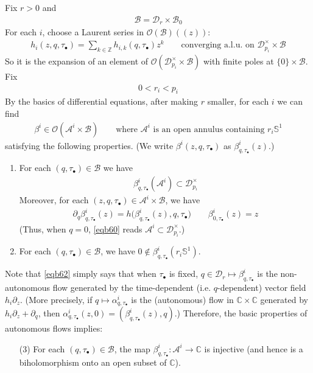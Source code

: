 \documentclass[11pt,b5paper,notitlepage]{article}
\theoremstyle{definition}
\theoremstyle{plain}
\newcommand{\mc}{\mathcal}
\newcommand{\Sbb}{\mathbb{S}}
\newcommand{\blt}{\bullet}
\newcommand{\Cbb}{\mathbb C}
\newcommand{\Zbb}{\mathbb Z}
\newcommand{\<}{\left\langle}
\renewcommand{\>}{\right\rangle}
\newcommand{\MB}{\mathcal{B}}
\numberwithin{equation}{subsection}
\begin{document}
Fix $r>0$ and
\begin{align*}
\MB=\mc D_r\times \MB_0
\end{align*}
For each $i$, choose a Laurent series in $\mc O(\MB)((z))$: 
\begin{align*}
h_i(z,q,\tau_\blt)=\sum_{k\in\Zbb}h_{i,k}(q,\tau_\blt)z^k\qquad\text{converging a.l.u. on }\mc D_{p_i}^\times\times\MB
\end{align*}
So it is the expansion of an element of $\mc O(\mc D_{p_i}^\times\times\MB)$ with finite poles at $\{0\}\times\MB$. Fix
\begin{align*}
0<r_i<p_i
\end{align*}
By the basics of differential equations, after making $r$ smaller, for each $i$ we can find
\begin{gather*}
\beta^i\in\mc O(\mc A^i\times\MB)\qquad\text{where $\mc A^i$ is an open annulus containing $r_i\Sbb^1$}
\end{gather*}
satisfying the following properties. (We write $\beta^i(z,q,\tau_\blt)$ as $\beta^i_{q,\tau_\blt}(z)$.)
\begin{enumerate}[label=(\arabic*)]
\item For each $(q,\tau_\blt)\in\MB$ we have
\begin{align}\label{eqb60}
\beta^i_{q,\tau_\blt}(\mc A^i)\subset \mc D_{p_i}^\times
\end{align}
Moreover, for each $(z,q,\tau_\blt)\in\mc A^i\times\MB$, we have
\begin{align}\label{eqb62}
\partial_q\beta^i_{q,\tau_\blt}(z)=h\big(\beta^i_{q,\tau_\blt}(z),q,\tau_\blt\big)\qquad \beta^i_{0,\tau_\blt}(z)=z
\end{align}
(Thus, when $q=0$, \eqref{eqb60} reads $\mc A^i\subset \mc D_{p_i}^\times$.)
\item For each $(q,\tau_\blt)\in\MB$, we have $0\notin\beta^i_{q,\tau_\blt}(r_i\Sbb^1)$.
\end{enumerate} 
Note that \eqref{eqb62} simply says that when $\tau_\blt$ is fixed, $q\in\mc D_r\mapsto \beta^i_{q,\tau_\blt}$ is the non-autonomous flow generated by the time-dependent (i.e. $q$-dependent) vector field $h_i\partial_z$. (More precisely, if $q\mapsto \alpha^i_{q,\tau_\blt}$ is the (autonomous) flow in $\Cbb\times\Cbb$ generated by $h_i\partial_z+\partial_q$, then $\alpha^i_{q,\tau_\blt}(z,0)=(\beta^i_{q,\tau_\blt}(z),q)$.) Therefore,  the basic properties of autonomous flows implies:
\begin{enumerate}
\item[(3)] For each $(q,\tau_\blt)\in\mc B$, the map $\beta^i_{q,\tau_\blt}:\mc A^i\rightarrow\Cbb$ is injective (and hence is a biholomorphism onto an open subset of $\Cbb$).
\end{enumerate}
\end{document}
